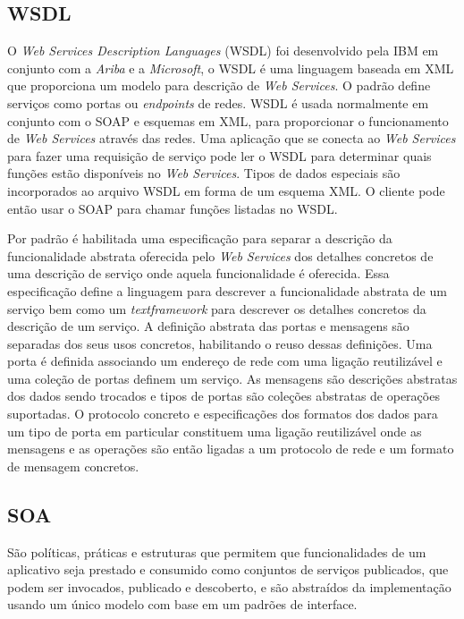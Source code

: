 \documentclass{acm_proc_article-sp}
\begin{document}
		
		
	\subsection{WSDL}
		
		O \emph{Web Services Description Languages} (WSDL) foi desenvolvido pela IBM em conjunto com a \emph{Ariba} e a \emph{Microsoft}, o WSDL é uma linguagem baseada em XML que proporciona um modelo para descrição de \emph{Web Services}. O padrão define serviços como portas ou \emph{endpoints }de redes. WSDL é usada normalmente em conjunto com o SOAP e esquemas em XML, para proporcionar o funcionamento de \emph{Web Services} através das redes. Uma aplicação que se conecta ao \emph{Web Services} para fazer uma requisição de serviço pode ler o WSDL para determinar quais funções estão disponíveis no \emph{Web Services}. Tipos de dados especiais são incorporados ao arquivo WSDL em forma de um esquema XML. O cliente pode então usar o SOAP para chamar funções listadas no WSDL.
		
		Por padrão é habilitada uma especificação para separar a descrição da funcionalidade abstrata oferecida pelo \emph{Web Services} dos detalhes concretos de uma descrição de serviço onde aquela funcionalidade é oferecida. Essa especificação define a linguagem para descrever a funcionalidade abstrata de um serviço bem como um \emph{textframework} para descrever os detalhes concretos da descrição de um serviço. A definição abstrata das portas e mensagens são separadas dos seus usos concretos, habilitando o reuso dessas definições. Uma porta é definida associando um endereço de rede com uma ligação reutilizável e uma coleção de portas definem um serviço. As mensagens são descrições abstratas dos dados sendo trocados e tipos de portas são coleções abstratas de operações suportadas. O protocolo concreto e especificações dos formatos dos dados para um tipo de porta em particular constituem uma ligação reutilizável onde as mensagens e as operações são então ligadas a um protocolo de rede e um formato de mensagem concretos. \cite{APACHE-AXIS}
		
		
	\subsection{SOA}
		
		São políticas, práticas e estruturas que permitem que funcionalidades de um aplicativo seja prestado e consumido como conjuntos de serviços publicados, que podem ser invocados, publicado e descoberto, e são abstraídos da implementação usando um único modelo com base em um padrões de interface.\cite{SOA-Microsoft}
		
\end{document}
